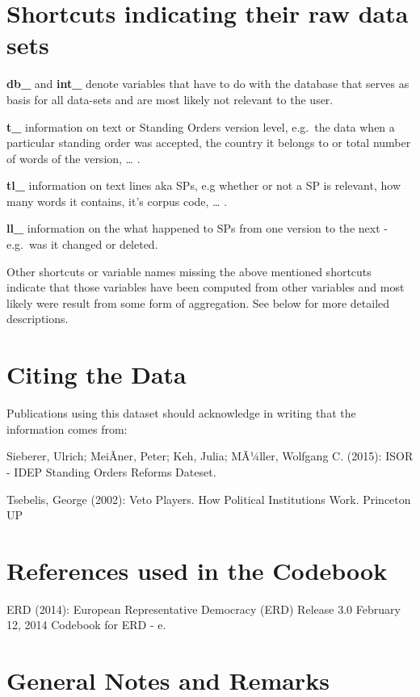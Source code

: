 \documentclass[]{article}
\begin{document}
\section{Shortcuts indicating their raw data
sets}\label{shortcuts-indicating-their-raw-data-sets}

\textbf{db\_} and \textbf{int\_} denote variables that have to do with
the database that serves as basis for all data-sets and are most likely
not relevant to the user.

\textbf{t\_} information on text or Standing Orders version level,
e.g.~the data when a particular standing order was accepted, the country
it belongs to or total number of words of the version, \ldots{} .

\textbf{tl\_} information on text lines aka SPs, e.g whether or not a SP
is relevant, how many words it contains, it's corpus code, \ldots{} .

\textbf{ll\_} information on the what happened to SPs from one version
to the next - e.g.~was it changed or deleted.

Other shortcuts or variable names missing the above mentioned shortcuts
indicate that those variables have been computed from other variables
and most likely were result from some form of aggregation. See below for
more detailed descriptions.

\section{Citing the Data}\label{citing-the-data}

Publications using this dataset should acknowledge in writing that the
information comes from:

Sieberer, Ulrich; MeiÃner, Peter; Keh, Julia; MÃ¼ller, Wolfgang C.
(2015): ISOR - IDEP Standing Orders Reforms Dateset.

Tsebelis, George (2002): Veto Players. How Political Institutions Work.
Princeton UP

\section{References used in the
Codebook}\label{references-used-in-the-codebook}

ERD (2014): European Representative Democracy (ERD) Release 3.0 February
12, 2014 Codebook for ERD - e.

\section{General Notes and Remarks}\label{general-notes-and-remarks}
\end{document}
